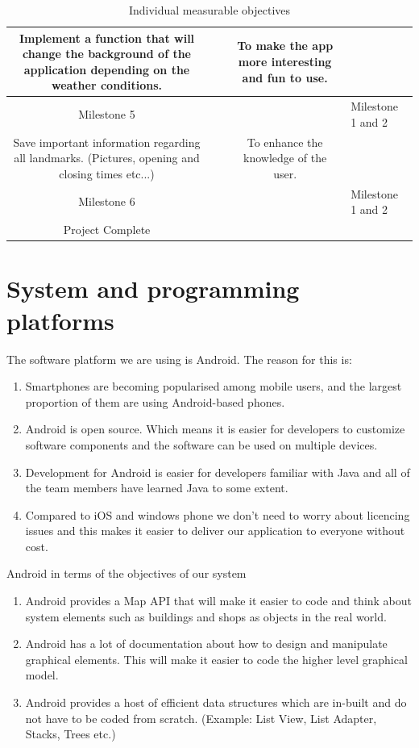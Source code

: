 \documentclass[10pt,a4paper,oneside]{report}
\begin{document}
\begin{table}[H]
\begin{tabularx}{1.3\textwidth}{ |S|E|S|E| }
  Implement a function that will change the background of the application depending on the weather conditions. & ~ & To make the app more interesting and fun to use. & ~ \\ \hline
  Milestone 5 & ~ & ~ & Milestone 1 and 2 \\ \hline
  Save important information regarding all landmarks. (Pictures, opening and closing times etc...) & ~ & To enhance the knowledge of the user. & ~ \\ \hline
  Milestone 6 & ~ & ~ & Milestone 1 and 2 \\ \hline
  Project Complete & ~ & ~ & ~ \\ \hline
\end{tabularx}
\caption{Individual measurable objectives}
\end{table}

\section*{System and programming platforms}
The software platform we are using is Android.  The reason for this is:
\begin{enumerate}
\item{Smartphones are becoming popularised among mobile users, and the largest proportion of them are using Android-based phones.}
\item{Android is open source. Which means it is easier for developers to customize software components and the software can be used on multiple devices.}
\item{Development for Android is easier for developers familiar with Java and all of the team members have learned Java to some extent.}
\item{Compared to iOS and windows phone we don't need to worry about licencing issues and this makes it easier to deliver our application to everyone without cost.}
\end{enumerate}
Android in terms of the objectives of our system
\begin{enumerate}
\item{Android provides a Map API that will make it easier to code and think about system elements such as buildings and shops as objects in the real world.}
\item{Android has a lot of documentation about how to design and manipulate graphical elements. This will make it easier to code the higher level graphical model.}
\item{Android provides a host of efficient data structures which are in-built and do not have to be coded from scratch. (Example: List View, List Adapter, Stacks, Trees etc.)}
\end{enumerate}
\end{document}

